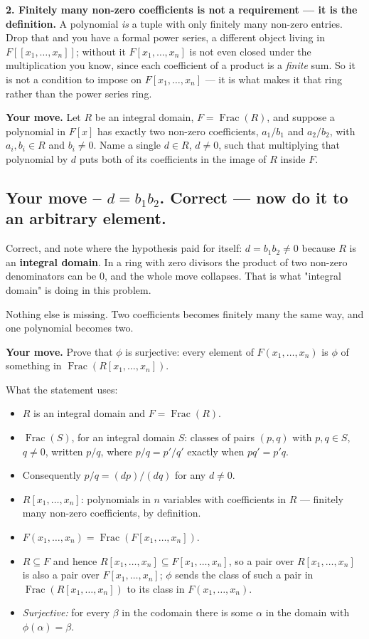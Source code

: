 \documentclass[11pt]{article}
\begin{document}
\textbf{2. Finitely many non-zero coefficients is not a requirement --- it is the definition.} A polynomial \emph{is} a tuple with only finitely many non-zero entries. Drop that and you have a formal power series, a different object living in $F[[x_1,\ldots,x_n]]$; without it $F[x_1,\ldots,x_n]$ is not even closed under the multiplication you know, since each coefficient of a product is a \emph{finite} sum. So it is not a condition to impose on $F[x_1,\ldots,x_n]$ --- it is what makes it that ring rather than the power series ring.

\textbf{Your move.} Let $R$ be an integral domain, $F = \operatorname{Frac}(R)$, and suppose a polynomial in $F[x]$ has exactly two non-zero coefficients, $a_1/b_1$ and $a_2/b_2$, with $a_i, b_i \in R$ and $b_i \neq 0$. Name a single $d \in R$, $d \neq 0$, such that multiplying that polynomial by $d$ puts both of its coefficients in the image of $R$ inside $F$.


\subsection*{Your move -- $d = b_1 b_2$. Correct --- now do it to an arbitrary element.}
Correct, and note where the hypothesis paid for itself: $d = b_1 b_2 \neq 0$ because $R$ is an \textbf{integral domain}. In a ring with zero divisors the product of two non-zero denominators can be $0$, and the whole move collapses. That is what "integral domain" is doing in this problem.

Nothing else is missing. Two coefficients becomes finitely many the same way, and one polynomial becomes two.

\textbf{Your move.} Prove that $\phi$ is surjective: every element of $F(x_1,\ldots,x_n)$ is $\phi$ of something in $\operatorname{Frac}(R[x_1,\ldots,x_n])$.

What the statement uses:

\begin{itemize}
  \item $R$ is an integral domain and $F = \operatorname{Frac}(R)$.
  \item $\operatorname{Frac}(S)$, for an integral domain $S$: classes of pairs $(p,q)$ with $p, q \in S$, $q \neq 0$, written $p/q$, where $p/q = p'/q'$ exactly when $pq' = p'q$.
  \item Consequently $p/q = (dp)/(dq)$ for any $d \neq 0$.
  \item $R[x_1,\ldots,x_n]$: polynomials in $n$ variables with coefficients in $R$ --- finitely many non-zero coefficients, by definition.
  \item $F(x_1,\ldots,x_n) = \operatorname{Frac}(F[x_1,\ldots,x_n])$.
  \item $R \subseteq F$ and hence $R[x_1,\ldots,x_n] \subseteq F[x_1,\ldots,x_n]$, so a pair over $R[x_1,\ldots,x_n]$ is also a pair over $F[x_1,\ldots,x_n]$; $\phi$ sends the class of such a pair in $\operatorname{Frac}(R[x_1,\ldots,x_n])$ to its class in $F(x_1,\ldots,x_n)$.
  \item \emph{Surjective:} for every $\beta$ in the codomain there is some $\alpha$ in the domain with $\phi(\alpha) = \beta$.
\end{itemize}
\end{document}

